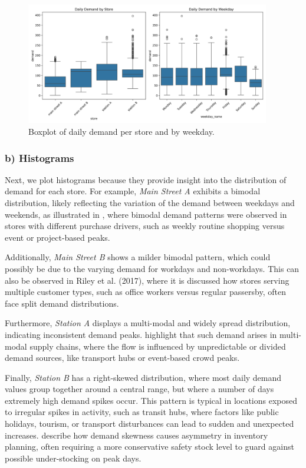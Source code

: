 \begin{figure}[H]
    \centering
    \includegraphics[width=0.95\textwidth]{figures/boxplot_store_and_weekday.png}
    \caption{Boxplot of daily demand per store and by weekday.}
    \label{fig:boxplots}
\end{figure}

\subsubsection*{b) Histograms}
Next, we plot histograms because they provide insight into the distribution of demand for each store. For example, \emph{Main Street A} exhibits a bimodal distribution, likely reflecting the variation of the demand between  weekdays and weekends, as illustrated in \cite{riley2017}, where bimodal demand patterns were observed in stores with different purchase drivers, such as weekly routine shopping versus event or project-based peaks.

Additionally, \emph{Main Street B} shows a milder bimodal pattern, which could possibly be due to the varying demand for workdays and non-workdays. This can also be observed in Riley et al. (2017), where it is discussed how stores serving multiple customer types, such as office workers versus regular passersby, often face split demand distributions.

Furthermore, \emph{Station A} displays a multi-modal and widely spread distribution, indicating inconsistent demand peaks. \cite{kharodawala2022} highlight that such demand arises in multi-modal supply chains, where the flow is influenced by unpredictable or divided demand sources, like transport hubs or event-based crowd peaks.

Finally, \emph{Station B} has a right-skewed distribution, where most daily demand values group together around a central range, but where a number of days extremely high demand spikes occur. This pattern is typical in locations exposed to irregular spikes in activity, such as transit hubs, where factors like public holidays, tourism, or transport disturbances can lead to sudden and unexpected increases. \cite{rojas2021} describe how demand skewness causes asymmetry in inventory planning, often requiring a more conservative safety stock level to guard against possible under-stocking on peak days.



